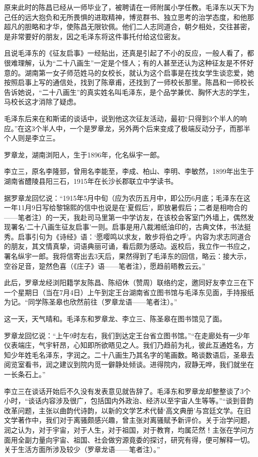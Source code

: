 \documentclass[../../dazhuan.tex]{subfiles}
\begin{document}
原来此时的陈昌已经从一师毕业了，被聘请在一师附属小学任教。毛泽东以天下为己任的远大抱负和无所畏惧的进取精神，博览群书、独立思考的治学态度，和他那超凡的胆略和才华，使陈昌无限钦佩。他们二人志同道合，朝夕相处，交往甚密，是非常要好的朋友，因之毛泽东将这件事托付给这位密友。

且说毛泽东的《征友启事》一经贴出，还真是引起了不小的反应，一般人看了，都很难理解，认为“二十八画生”一定是个怪人；有的人甚至还认为这种征友是不怀好意的。湖南第一女子师范姓马的女校长，就认为这个启事是在找女学生谈恋爱，她按照启事上写的通信处，找到了陈章甫，还找到了一师校长那里。陈昌和一师校长告诉她说，“二十八画生”的真实姓名叫毛泽东，是个品学兼优、胸怀大志的学生，马校长这才消除了疑虑。

毛泽东后来在和斯诺的谈话中，说到他这次征友活动，最初“只得到3个半人的响应。”在这3个半人中，一个是罗章龙，另外两个后来变成了极端反动分子，而那半个人则是李立三。

罗章龙，湖南浏阳人，生于1896年，化名纵宇一郎。

李立三，原名李隆郅，曾用名李能至，李成、柏山、李明、李敏然，1899年出生于湖南省醴陵县阳三石，1915年在长沙长郡联立中学读书。

据罗章龙回忆说：“1915年5月中旬（应为农历五月中，即公历6月底；毛泽东在这一年11月9日写给黎锦熙的信中也说是在‘夏假后’，即放暑假后；二者是相吻合的——笔者注）的一天，我赴司马里第一中学访友，在该校会客室门外墙上，偶然发现署名‘二十八画生征友启事’一则。启事是用八裁湘纸油印的，古典文体，书法挺秀。启事引句为《诗经》语：‘愿嘤鸣以求友，敢步将伯之呼’。内容为求志同道合的朋友，其文情真挚，词语典丽可诵，看后颇为感动。返校后，我立作一书应之，署名纵宇一郎。我将信寄出去3天后，果然得到了毛泽东的回信，略云：接大示，空谷足音，跫然色喜（《庄子》语——笔者注），愿趋前晤教云云。”

此后，罗章龙经浏阳籍学友陈昌、陈绍休（赞周）联络约定，邀同好友李立三在下一个星期日（当在7月4日）上午到定王台湖南省立图书馆与毛泽东见面，手持报纸为记。“同学陈圣皋也欣然前往（罗章龙语——笔者注）。” 

这一天，天气晴和。毛泽东和罗章龙、李立三、陈圣皋在图书馆见了面。

罗章龙回忆说：“上午9时左右，我们到达定王台省立图书馆。”“在走廊处有一少年仪表端庄，气宇轩昂，心知即所欲晤见之人。我们乃趋前为礼，彼此互通姓名，方知少年姓毛名泽东，字润之。二十八画生乃其名字的笔画数。略谈数语后，圣皋去阅览室看书，润之建议到院内觅一僻静处倾谈。进得院内，寂静无哗，我们就坐在一长条石上。”

李立三在谈话开始后不久没有发表意见就告辞了。毛泽东和罗章龙却整整谈了3个小时，“谈话内容涉及很广，包括国内外政治、经济以至宇宙人生等等。”“谈到音韵改革问题，主张以曲韵代诗韵，以新的文学艺术代替‘高文典册’与宫廷文学。在旧文学著作中，我们对于离骚颇感兴趣，曾主张对离骚赋予新评价。关于治学问题，润之认为，对于宇宙，对于人生，对于祖国，对于教育，均属茫然！主张在学问方面用全副力量向宇宙、祖国、社会做穷源竟委的探讨，研究有得，便可解释一切。关于生活方面所涉及较少（罗章龙语——笔者注）。” 
\end{document}
